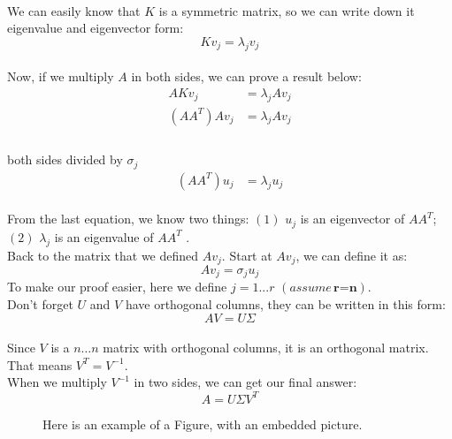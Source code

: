 \documentclass{article}
\begin{document}
\\
We can easily know that $K$ is a symmetric matrix, so we can write down it eigenvalue and eigenvector form:
\begin{equation}
	Kv_j = \lambda_j v_j
\end{equation}  
\\
Now, if we multiply $A$ in both sides, we can prove a result below:
\begin{align*}
	AKv_j  &= \lambda_j A v_j \\
	(AA^T)Av_j  &= \lambda_j A v_j \\
\end{align*}
\\
both sides divided by $\sigma_j$
\begin{align*}
	(AA^T)u_j  &= \lambda_j  u_j
\end{align*}
\\
From the last equation, we know two things: $(1)$ $u_j$ is an eigenvector of $AA^T$; $(2)$ $\lambda_j$ is an eigenvalue of $AA^T$ .
\\[2in]
Back to the matrix that we defined $Av_j$. Start at $Av_j$, we can define it as:
\begin{equation}
	Av_j = \sigma_j u _j
\end{equation}
To make our proof easier, here we define $j = 1 ... r$ $(assume \, \textbf{r=n})$.
\\[3in]
Don't forget $U$ and $V$ have orthogonal columns, they can be written in this form:
\begin{equation}
	AV = U \Sigma
\end{equation}
\\
Since $V$ is a $n \dots n$ matrix with orthogonal columns, it is an orthogonal  matrix. That means $V^T = V^{-1}$.
\\
When we multiply $V^{-1}$ in two sides, we can get our final answer:
\begin{equation}
	A = U \Sigma V^T 
\end{equation} 



\begin{figure}
	\caption{Here is an example of a Figure, with an embedded picture.}
\end{figure}
\end{document}
